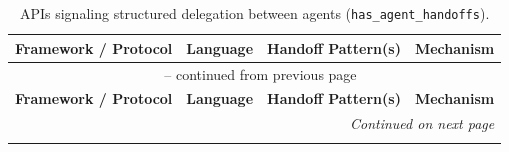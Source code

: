 {\footnotesize
\renewcommand{\arraystretch}{0.9}
\begin{longtable}{@{}p{}p{}p{}p{}@{}}
\caption{APIs signaling structured delegation between agents (\texttt{has\_agent\_handoffs}).}
\label{tab:agent-handoff-apis} \\
\toprule
\textbf{Framework / Protocol} & \textbf{Language} & \textbf{Handoff Pattern(s)} & \textbf{Mechanism} \\
\midrule
\endfirsthead
\multicolumn{4}{c}{\tablename\ \thetable{} -- continued from previous page} \\
\toprule
\textbf{Framework / Protocol} & \textbf{Language} & \textbf{Handoff Pattern(s)} & \textbf{Mechanism} \\
\midrule
\endhead
\midrule
\multicolumn{4}{r}{\textit{Continued on next page}} \\
\endfoot
\bottomrule
\endlastfoot


\end{longtable}}
